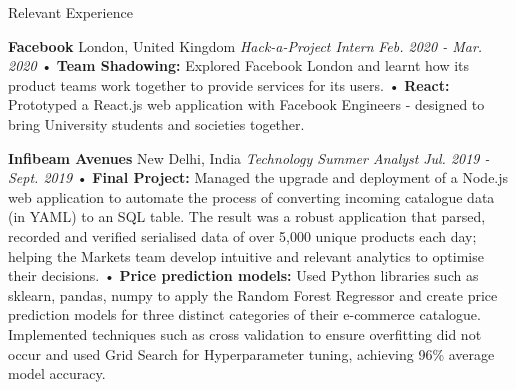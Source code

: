 \documentclass{resume}
\begin{document}
\begin{rSection}{\small{Relevant Experience}}

{\bf \footnotesize Facebook}
\hfill {\footnotesize London, United Kingdom} \newline
{\footnotesize\textit{{Hack-a-Project Intern}}} \hfill {\footnotesize \textit{Feb. 2020 - Mar. 2020}} \newline
\indent \indent \indent \footnotesize{ • \textbf{Team Shadowing:} Explored Facebook London and learnt how its product teams work together to provide services for its users.} \newline
\indent \indent \indent \footnotesize{ • \textbf{React:} Prototyped a React.js web application with Facebook Engineers - designed to bring University students and societies together.}

{\bf \footnotesize Infibeam Avenues} \hfill {\footnotesize New Delhi, India} \newline
{\footnotesize\textit{{Technology Summer Analyst}}} \hfill {\footnotesize \textit{Jul. 2019 - Sept. 2019}} \newline
\indent \indent \indent \footnotesize{ • \textbf{Final Project:} Managed the upgrade and deployment of a Node.js web application to automate the process of converting incoming} \newline
\indent \indent \indent \footnotesize{  catalogue data (in YAML) to an SQL table. The result was a robust application that parsed, recorded and verified serialised data of} \newline
\indent \indent \indent \footnotesize{  over 5,000 unique products each day; helping the Markets team develop intuitive and relevant analytics to optimise their decisions.} \newline
\indent \indent \indent \footnotesize{ • \textbf{Price prediction models:} Used Python libraries such as sklearn, pandas, numpy to apply the Random Forest Regressor and} \newline
\indent \indent \indent \footnotesize{ create price prediction models for three distinct categories of their e-commerce catalogue. Implemented techniques such as cross}\newline
\indent \indent \indent \footnotesize{  validation to ensure overfitting did not occur and used Grid Search for Hyperparameter tuning, achieving 96\% average model accuracy.}


\end{rSection}
\end{document}
